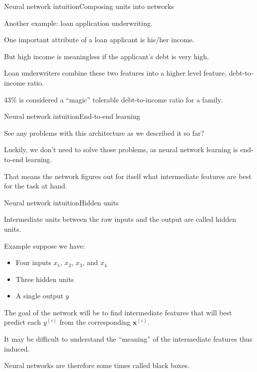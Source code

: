 \documentclass{beamer}
\renewcommand{\vec}[1]{\boldsymbol{#1}}
\begin{document}
\begin{frame}{Neural network intuition}{Composing units into networks}

  Another example: \alert{loan application underwriting}.

  \medskip

  One important attribute of a loan applicant is his/her \alert{income}.

  \medskip

  But high income is meaningless if the applicant's \alert{debt} is very
  high.

  \medskip

  Loan underwriters combine these two features into a higher level feature,
  \alert{debt-to-income ratio}.

  \medskip

  43\% is considered a ``magic'' tolerable debt-to-income ratio for a family.

\end{frame}


\begin{frame}{Neural network intuition}{End-to-end learning}

  See any problems with this architecture as we described it so far?

  \medskip

  Luckily, we don't need to solve those problems, as neural network
  learning is \alert{end-to-end learning}.

  \medskip

  That means \alert{the network figures out for itself what
    intermediate features are best for the task at hand}.

\end{frame}


\begin{frame}{Neural network intuition}{Hidden units}

  Intermediate units between the raw inputs and the output
  are called \alert{hidden units}.

  \medskip

  Example suppose we have:
  \begin{itemize}
  \item Four inputs $x_1$, $x_2$, $x_3$, and $x_4$
  \item Three hidden units
  \item A single output $y$
  \end{itemize}

  \medskip
  
  The goal of the network will be to \alert{find} intermediate
  features that will \alert{best predict} each $y^{(i)}$ from the
  corresponding $\vec{x}^{(i)}$.

  \medskip

  It may be difficult to understand the ``meaning'' of the intermediate
  features thus induced.

  \medskip

  Neural networks are therefore some times called \alert{black boxes}.

\end{frame}
\end{document}
